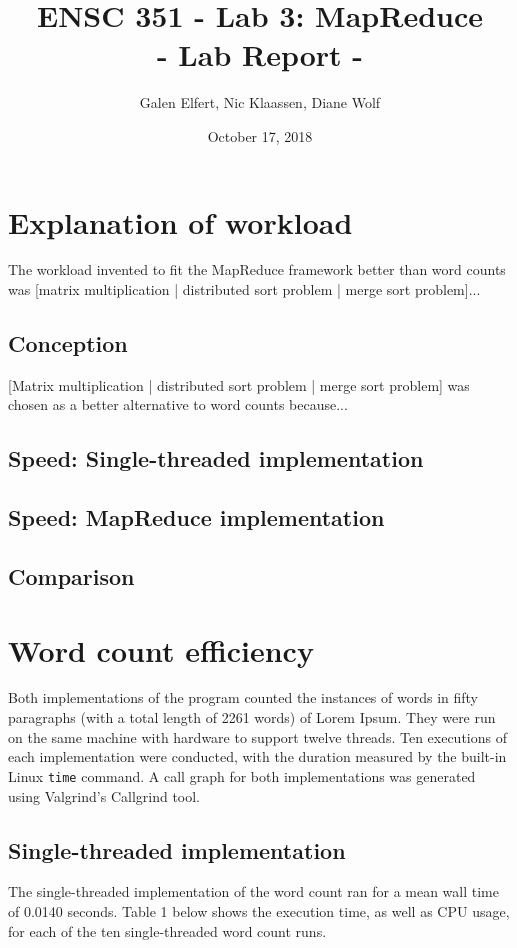 \documentclass[12pt, letterpaper]{article}
\begin{document}
\title{ENSC 351 - Lab 3: MapReduce\\ \large{- Lab Report -}}
\date{October 17, 2018}
\author{Galen Elfert, Nic Klaassen, Diane Wolf}
\maketitle
\section{Explanation of workload}
	The workload invented to fit the MapReduce framework better than word counts was {[matrix multiplication | distributed sort problem | merge sort problem]...}
\subsection{Conception}
	{[Matrix multiplication | distributed sort problem | merge sort problem]} was chosen as a better alternative to word counts because...
\subsection{Speed: Single-threaded implementation}
	
\subsection{Speed: MapReduce implementation}
\subsection{Comparison}
\section{Word count efficiency}
	Both implementations of the program counted the instances of words in fifty paragraphs (with a total length of 2261 words) of Lorem Ipsum. They were run on the same machine with hardware to support twelve threads. Ten executions of each implementation were conducted, with the duration measured by the built-in Linux \texttt{time} command. A call graph for both implementations was generated using Valgrind's Callgrind tool.
\subsection{Single-threaded implementation}
	The single-threaded implementation of the word count ran for a mean wall time of 0.0140 seconds. Table 1 below shows the execution time, as well as CPU usage, for each of the ten single-threaded word count runs.\newline
	
\end{document}
